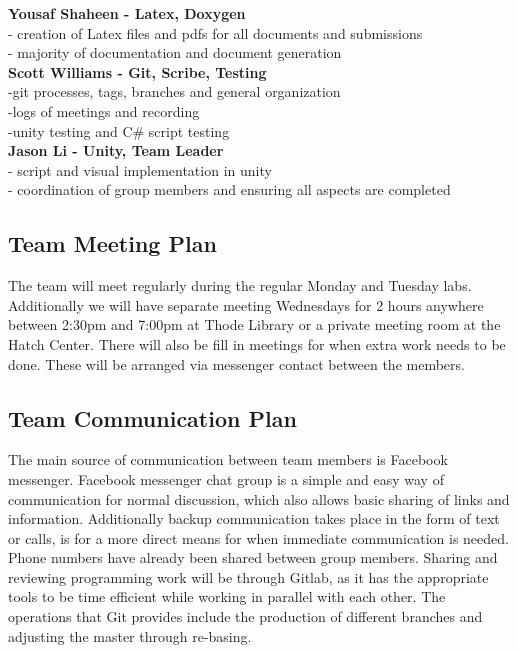 \documentclass[12pt]{article}
\begin{document}
\textbf{Yousaf Shaheen - Latex, Doxygen}\\
	- creation of Latex files and pdfs for all documents and submissions\\
 	- majority of documentation and document generation\\
 	
\textbf{Scott Williams - Git, Scribe, Testing}\\
	-git processes, tags, branches and general organization\\
	-logs of meetings and recording \\
	-unity testing and C\# script testing\\
       
\textbf{Jason Li - Unity, Team Leader} \\
	- script and visual implementation in unity\\
	- coordination of group members and ensuring all aspects are completed \\


\subsection{Team Meeting Plan}
The team will meet regularly during the regular Monday and Tuesday labs. Additionally we will have separate meeting Wednesdays for 2 hours anywhere between 2:30{\color{blue}pm} and 7:00{\color{blue}pm} at Thode Library or a private meeting room at the Hatch Center. There will also be fill in meetings for when extra work needs to be done. These will be arranged via messenger contact between the members.

\newpage

\subsection{Team Communication Plan}
The main source of communication between team members is Facebook messenger. Facebook messenger chat group is a simple and easy way of communication for normal discussion, which also allows basic sharing of links and information. Additionally backup communication takes place in the form of text or calls, is for a more direct means for when immediate communication is needed. Phone numbers have already been shared between group members. Sharing and reviewing programming work will be through Gitlab, as it has the appropriate tools to be time efficient while working in parallel with each other. The operations that Git provides include the production of different branches and adjusting the master through re-basing. 
\end{document}
